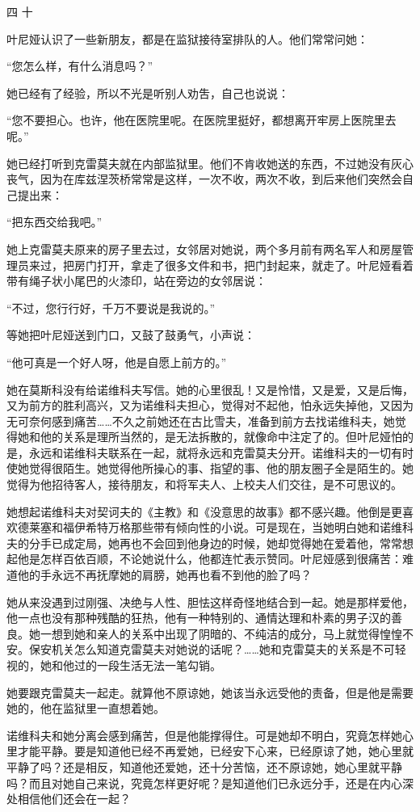 四 十

叶尼娅认识了一些新朋友，都是在监狱接待室排队的人。他们常常问她：

“您怎么样，有什么消息吗？”

她已经有了经验，所以不光是听别人劝吿，自己也说说：

“您不要担心。也许，他在医院里呢。在医院里挺好，都想离开牢房上医院里去呢。”

她已经打听到克雷莫夫就在内部监狱里。他们不肯收她送的东西，不过她没有灰心丧气，因为在库兹涅茨桥常常是这样，一次不收，两次不收，到后来他们突然会自己提出来：

“把东西交给我吧。”

她上克雷莫夫原来的房子里去过，女邻居对她说，两个多月前有两名军人和房屋管理员来过，把房门打开，拿走了很多文件和书，把门封起来，就走了。叶尼娅看着带有绳子状小尾巴的火漆印，站在旁边的女邻居说：

“不过，您行行好，千万不要说是我说的。”

等她把叶尼娅送到门口，又鼓了鼓勇气，小声说：

“他可真是一个好人呀，他是自愿上前方的。”

她在莫斯科没有给诺维科夫写信。她的心里很乱！又是怜惜，又是爱，又是后悔，又为前方的胜利高兴，又为诺维科夫担心，觉得对不起他，怕永远失掉他，又因为无可奈何感到痛苦……不久之前她还在古比雪夫，准备到前方去找诺维科夫，她觉得她和他的关系是理所当然的，是无法拆散的，就像命中注定了的。但叶尼娅怕的是，永远和诺维科夫联系在一起，就将永远和克雷莫夫分开。诺维科夫的一切有时使她觉得很陌生。她觉得他所操心的事、指望的事、他的朋友圈子全是陌生的。她觉得为他招待客人，接待朋友，和将军夫人、上校夫人们交往，是不可思议的。

她想起诺维科夫对契诃夫的《主教》和《没意思的故事》都不感兴趣。他倒是更喜欢德莱塞和福伊希特万格那些带有倾向性的小说。可是现在，当她明白她和诺维科夫的分手已成定局，她再也不会回到他身边的时候，她却觉得她在爱着他，常常想起他是怎样百依百顺，不论她说什么，他都连忙表示赞同。叶尼娅感到很痛苦：难道他的手永远不再抚摩她的肩膀，她再也看不到他的脸了吗？

她从来没遇到过刚强、决绝与人性、胆怯这样奇怪地结合到一起。她是那样爱他，他一点也没有那种残酷的狂热，他有一种特别的、通情达理和朴素的男子汉的善良。她一想到她和亲人的关系中出现了阴暗的、不纯洁的成分，马上就觉得惶惶不安。保安机关怎么知道克雷莫夫对她说的话呢？……她和克雷莫夫的关系是不可轻视的，她和他过的一段生活无法一笔勾销。

她要跟克雷莫夫一起走。就算他不原谅她，她该当永远受他的责备，但是他是需要她的，他在监狱里一直想着她。

诺维科夫和她分离会感到痛苦，但是他能撑得住。可是她却不明白，究竟怎样她心里才能平静。要是知道他已经不再爱她，已经安下心来，已经原谅了她，她心里就平静了吗？还是相反，知道他还爱她，还十分苦恼，还不原谅她，她心里就平静吗？而且对她自己来说，究竟怎样更好呢？是知道他们已永远分手，还是在内心深处相信他们还会在一起？


